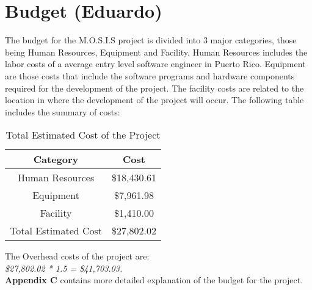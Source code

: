 
 \section{Budget (Eduardo)}
 The budget for the M.O.S.I.S project is divided into 3 major categories, those being Human Resources, Equipment and Facility. Human Resources includes the labor costs of a average entry level software engineer in Puerto Rico\cite{SoftwareEngineerSalary}. Equipment are those costs that include the software programs and hardware components required for the development of the project. The facility costs are related to the location in where the development of the project will occur. The following table includes the summary of costs:
 \begin{table}[H]
    \centering
    \begin{tabular}{||c | c||} 
     \hline
     \rowcolor{cyan}
     Category & Cost \\ [0.5ex] 
     \hline
     Human Resources & \$18,430.61\\ 
     \hline
     Equipment & \$7,961.98\\
     \hline
     Facility & \$1,410.00\\
     \hline
     \rowcolor{teal}
     Total Estimated Cost & \$27,802.02\\
     \hline
    \end{tabular}
    \caption {Total Estimated Cost of the Project}
    \label {table:1}
\end{table}
The Overhead costs of the project are:\\
\textit{\$27,802.02 * 1.5 = \$41,703.03.}
\\\textbf{Appendix C} contains more detailed explanation of the budget for the project.